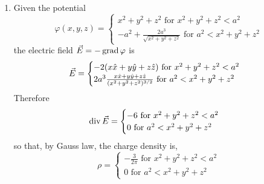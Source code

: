 \documentclass{article}
\begin{document}
\begin{enumerate}
The figures were generated using
\begin{verbatim}
import numpy as np
import matplotlib.pyplot as plt

def varphi(y: float) -> float:
    return -2 * (1/y - 1/np.sqrt(1 + (y - 1)**2))

def plot(ymin: float,
         ymax: float,
         fname: str,
         loc: str='best',
         show_x_axis: bool=True) -> None:
    Y = np.linspace(ymin, ymax)
    V = [varphi(y) for y in Y]
    label = f'In range [{ymin}, {ymax}]'
    plt.plot(Y, V, label=label)
    if show_x_axis:
        plt.hlines(y=0, xmin=ymin, xmax=ymax, color='red')
        
    plt.xlabel(r'$y$')
    plt.ylabel(r'$\varphi(y)$')
    plt.legend(loc=loc)
    plt.savefig(fname)
    plt.close()


def main():
    plot(-2, 2, 'course/purcell_c2p3a.png')
    plot(1.5, 1.7, 'course/purcell_c2p3b.png', show_x_axis=False)   
    plot(0.1, 2, 'course/purcell_c2p3c.png', loc='lower right')
    plot(-5, -0.1, 'course/purcell_c2p3d.png')
    plot(1, 5, 'course/purcell_c2p3e.png')


if __name__ == '__main__':
    main()

\end{verbatim}

\item Given the potential
\begin{equation}\label{e11}
\varphi(x, y, z) = \begin{cases}
x^2 + y^2 + z^2 \text{ for } x^2 + y^2 + z^2 < a^2 \\
-a^2 + \frac{2a^3}{\sqrt{x^2 + y^2 + z^2}} \text{ for } a^2 < x^2 + y^2 + z^2
\end{cases}
\end{equation}
the electric field $\vec{E} = -\operatorname{grad}\varphi$ is
\begin{equation}\label{e12}
\vec{E} = \begin{cases} -2(x\hat{x} + y\hat{y} + z\hat{z}) \text{ for } x^2 + y^2 + z^2 < a^2 \\
2a^3\frac{x\hat{x} + y\hat{y} + z\hat{z}}{(x^2 + y^2 + z^2)^{3/2}} \text{ for } a^2 < x^2 + y^2 + z^2
\end{cases}
\end{equation}
Therefore 
\begin{equation}\label{e13}
\operatorname{div}\vec{E} = \begin{cases} -6 \text{ for } x^2 + y^2 + z^2 < a^2 \\
0 \text{ for } a^2 < x^2 + y^2 + z^2
\end{cases}
\end{equation}
so that, by Gauss law, the charge density is,
\begin{equation}\label{e14}
\rho = \begin{cases} -\frac{3}{2\pi} \text{ for } x^2 + y^2 + z^2 < a^2 \\
0 \text{ for } a^2 < x^2 + y^2 + z^2
\end{cases}
\end{equation}


\end{enumerate}
\end{document}
